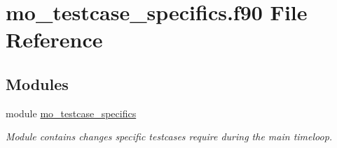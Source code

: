 \hypertarget{mo__testcase__specifics_8f90}{
\section{mo\_\-testcase\_\-specifics.f90 File Reference}
\label{mo__testcase__specifics_8f90}
}
\subsection*{Modules}
\begin{DoxyCompactItemize}
\item 
module \hyperlink{namespacemo__testcase__specifics}{mo\_\-testcase\_\-specifics}


\begin{DoxyCompactList}\small\item\em Module contains changes specific testcases require during the main timeloop. \item\end{DoxyCompactList}

\end{DoxyCompactItemize}

